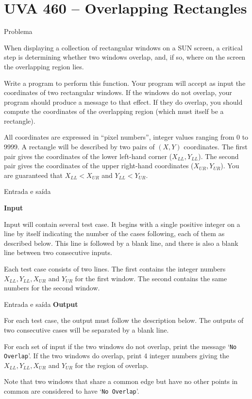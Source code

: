 \section{UVA 460 -- Overlapping Rectangles}

\begin{frame}[fragile]{Problema}

When displaying a collection of rectangular windows on a SUN screen, a critical step is 
determining whether two windows overlap, and, if so, where on the screen the overlapping region 
lies.

Write a program to perform this function. Your program will accept as input the coordinates of
two rectangular windows. If the windows do not overlap, your program should produce a message to
that effect. If they do overlap, you should compute the coordinates of the overlapping region 
(which must itself be a rectangle).

All coordinates are expressed in ``pixel numbers”, integer values ranging from 0 to 9999. A 
rectangle will be described by two pairs of $(X, Y)$ coordinates. The first pair gives the 
coordinates of the lower left-hand corner ($X_{LL}, Y_{LL}$). The second pair gives the 
coordinates of the upper right-hand coordinates
($X_{UR}, Y_{UR}$). You are guaranteed that $X_{LL} < X_{UR}$ and $Y_{LL} < Y_{UR}$.
\end{frame}

\begin{frame}[fragile]{Entrada e saída}

\textbf{Input}

Input will contain several test case. It begins with a single positive integer on a line by itself 
indicating the number of the cases following, each of them as described below. This line is 
followed by a blank line, and there is also a blank line between two consecutive inputs.

Each test case consists of two lines. The first contains the integer numbers $X_{LL}, Y_{LL}, X_{UR}$ and
$Y_{UR}$ for the first window. The second contains the same numbers for the second window.
\end{frame}

\begin{frame}[fragile]{Entrada e saída}
\textbf{Output}

For each test case, the output must follow the description below. The outputs of two consecutive 
cases will be separated by a blank line.

For each set of input if the two windows do not overlap, print the message `\texttt{No Overlap}’. 
If the two windows do overlap, print 4 integer numbers giving the $X_{LL}, Y_{LL}, X_{UR}$ and 
$Y_{UR}$ for the region of overlap.

Note that two windows that share a common edge but have no other points in common are considered
to have `\texttt{No Overlap}’.

\end{frame}

